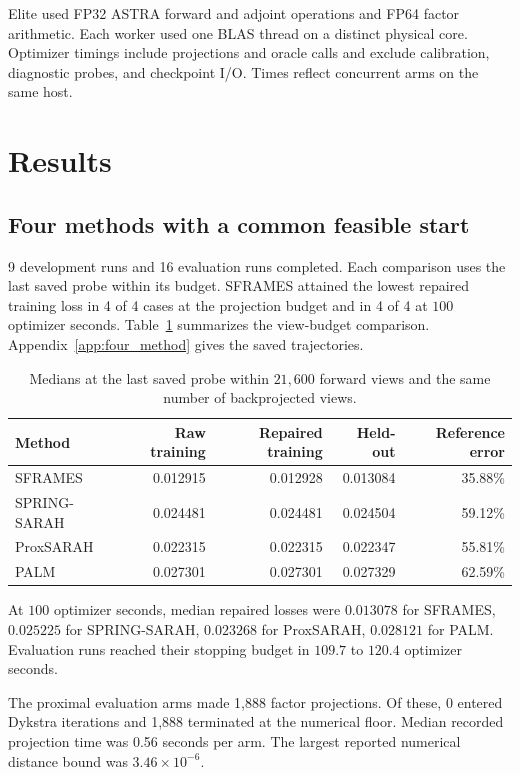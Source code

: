 \documentclass[11pt]{article}
\begin{document}
Elite used FP32 ASTRA forward and adjoint operations and FP64 factor arithmetic. Each worker used one BLAS thread on a distinct physical core. Optimizer timings include projections and oracle calls and exclude calibration, diagnostic probes, and checkpoint I/O. Times reflect concurrent arms on the same host.
\section{Results}\label{sec:results}

\subsection{Four methods with a common feasible start}

9 development runs and 16 evaluation runs completed. Each comparison uses the last saved probe within its budget. SFRAMES attained the lowest repaired training loss in 4 of 4 cases at the projection budget and in 4 of 4 at \(100\) optimizer seconds. Table~\ref{tab:matched-methods} summarizes the view-budget comparison. Appendix~\ref{app:four_method} gives the saved trajectories.

\begin{table}[htbp]
\centering
\caption{Medians at the last saved probe within \(21{,}600\) forward views and the same number of backprojected views.}
\label{tab:matched-methods}
\begin{tabular}{@{}lrrrr@{}}
\toprule
Method & Raw training & Repaired training & Held-out & Reference error \\
\midrule
SFRAMES & 0.012915 & 0.012928 & 0.013084 & 35.88\% \\
SPRING-SARAH & 0.024481 & 0.024481 & 0.024504 & 59.12\% \\
ProxSARAH & 0.022315 & 0.022315 & 0.022347 & 55.81\% \\
PALM & 0.027301 & 0.027301 & 0.027329 & 62.59\% \\
\bottomrule
\end{tabular}
\end{table}

At \(100\) optimizer seconds, median repaired losses were \(0.013078\) for SFRAMES, \(0.025225\) for SPRING-SARAH, \(0.023268\) for ProxSARAH, \(0.028121\) for PALM. Evaluation runs reached their stopping budget in \(109.7\) to \(120.4\) optimizer seconds.

The proximal evaluation arms made 1,888 factor projections. Of these, 0 entered Dykstra iterations and 1,888 terminated at the numerical floor. Median recorded projection time was 0.56 seconds per arm. The largest reported numerical distance bound was \(3.46\times 10^{-6}\).
\end{document}
